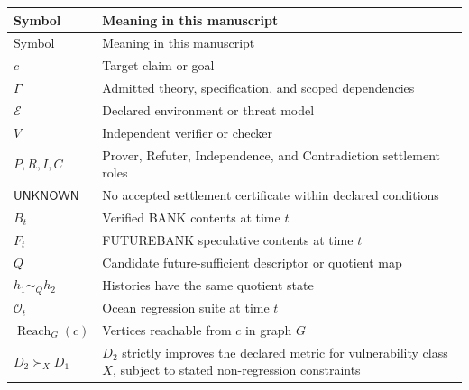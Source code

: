 \documentclass[11pt,oneside]{book}
\theoremstyle{definition}
\theoremstyle{remark}
\newcommand{\OCEAN}{\mathcal O}
\newcommand{\Reach}{\operatorname{Reach}}
\newcommand{\UNKNOWN}{\mathsf{UNKNOWN}}
\begin{document}
\begin{longtable}{>{\raggedright\arraybackslash}p{}>{\raggedright\arraybackslash}p{}}
\toprule
Symbol & Meaning in this manuscript \\
\midrule
\endfirsthead
\toprule
Symbol & Meaning in this manuscript \\
\midrule
\endhead
\(c\) & Target claim or goal \\
\(\Gamma\) & Admitted theory, specification, and scoped dependencies \\
\(\mathcal E\) & Declared environment or threat model \\
\(V\) & Independent verifier or checker \\
\(P,R,I,C\) & Prover, Refuter, Independence, and Contradiction settlement roles \\
\(\UNKNOWN\) & No accepted settlement certificate within declared conditions \\
\(B_t\) & Verified BANK contents at time \(t\) \\
\(F_t\) & FUTUREBANK speculative contents at time \(t\) \\
\(Q\) & Candidate future-sufficient descriptor or quotient map \\
\(h_1\sim_Qh_2\) & Histories have the same quotient state \\
\(\OCEAN_t\) & Ocean regression suite at time \(t\) \\
\(\Reach_G(c)\) & Vertices reachable from \(c\) in graph \(G\) \\
\(D_2\succ_XD_1\) & \(D_2\) strictly improves the declared metric for vulnerability class \(X\), subject to stated non-regression constraints \\
\bottomrule
\end{longtable}

\backmatter
\end{document}
